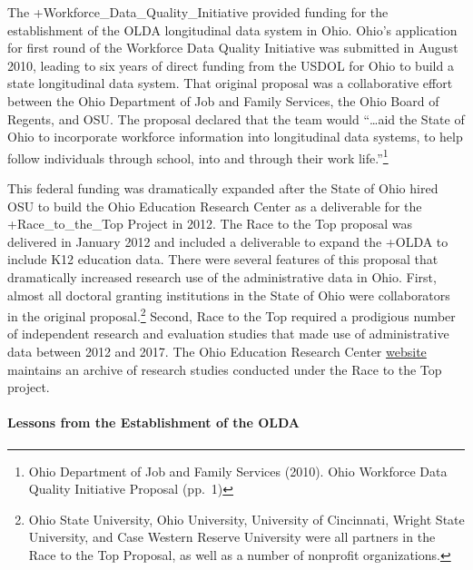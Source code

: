 \documentclass[
]{WileySix}
\begin{document}
The +Workforce\_Data\_Quality\_Initiative\textbar{} provided funding for the establishment of the OLDA longitudinal data system in Ohio. Ohio's application for first round of the Workforce Data Quality Initiative was submitted in August 2010, leading to six years of direct funding from the USDOL for Ohio to build a state longitudinal data system. That original proposal was a collaborative effort between the Ohio Department of Job and Family Services, the Ohio Board of Regents, and OSU. The proposal declared that the team would ``\ldots aid the State of Ohio to incorporate workforce information into longitudinal data systems, to help follow individuals through school, into and through their work life.''\footnote{Ohio Department of Job and Family Services (2010). Ohio Workforce Data Quality Initiative Proposal (pp.~1)}

This federal funding was dramatically expanded after the State of Ohio hired OSU to build the Ohio Education Research Center as a deliverable for the +Race\_to\_the\_Top\textbar{} Project in 2012. The Race to the Top proposal was delivered in January 2012 and included a deliverable to expand the +OLDA\textbar{} to include K12 education data. There were several features of this proposal that dramatically increased research use of the administrative data in Ohio. First, almost all doctoral granting institutions in the State of Ohio were collaborators in the original proposal.\footnote{Ohio State University, Ohio University, University of Cincinnati, Wright State University, and Case Western Reserve University were all partners in the Race to the Top Proposal, as well as a number of nonprofit organizations.} Second, Race to the Top required a prodigious number of independent research and evaluation studies that made use of administrative data between 2012 and 2017. The Ohio Education Research Center \href{www.oerc.osu.edu}{website} maintains an archive of research studies conducted under the Race to the Top project.

\hypertarget{lessons-from-the-establishment-of-the-olda}{%
\paragraph{Lessons from the Establishment of the OLDA}\label{lessons-from-the-establishment-of-the-olda}}
\end{document}
